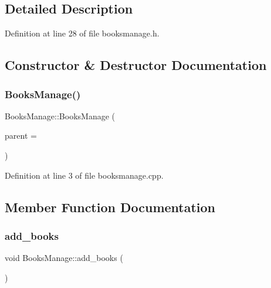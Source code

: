 \subsection{Detailed Description}


Definition at line 28 of file booksmanage.\+h.



\subsection{Constructor \& Destructor Documentation}
\mbox{\label{class_books_manage_adc44f2312ab4d2cd48868ff923fa8861}} 
\subsubsection{\texorpdfstring{BooksManage()}{BooksManage()}}
{\footnotesize\ttfamily Books\+Manage\+::\+Books\+Manage (\begin{DoxyParamCaption}\item[{Q\+Widget $\ast$}]{parent = {} }\end{DoxyParamCaption})\hspace{0.3cm}{\ttfamily [explicit]}}



Definition at line 3 of file booksmanage.\+cpp.



\subsection{Member Function Documentation}
\mbox{\label{class_books_manage_a39c7bdd07e0af93379e1270becd8525c}} 
\subsubsection{\texorpdfstring{add\_books}{add\_books}}
{\footnotesize\ttfamily void Books\+Manage\+::add\+\_\+books (\begin{DoxyParamCaption}{ }\end{DoxyParamCaption})\hspace{0.3cm}{\ttfamily [slot]}}




